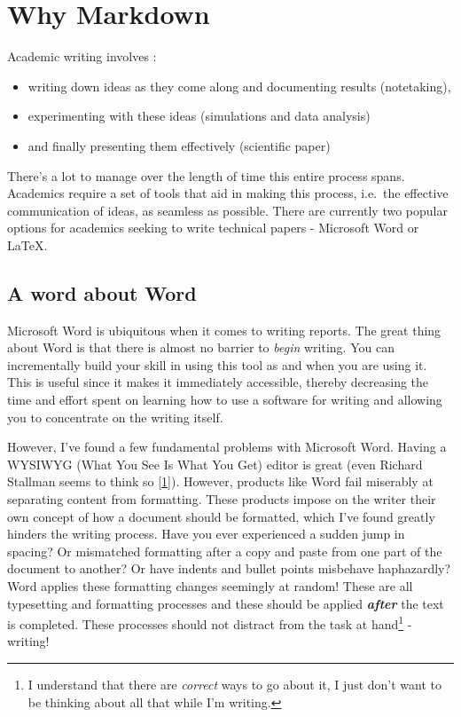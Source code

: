 \documentclass[journal,10pt,final]{IEEEtran}
\providecommand{\tightlist}{%
  \setlength{\itemsep}{0pt}\setlength{\parskip}{0pt}}
\begin{document}
\section{Why Markdown}\label{why-markdown}

Academic writing involves :

\begin{itemize}
\tightlist
\item
  writing down ideas as they come along and documenting results
  (notetaking),
\item
  experimenting with these ideas (simulations and data analysis)
\item
  and finally presenting them effectively (scientific paper)
\end{itemize}

There's a lot to manage over the length of time this entire process
spans. Academics require a set of tools that aid in making this process,
i.e.~the effective communication of ideas, as seamless as possible.
There are currently two popular options for academics seeking to write
technical papers - Microsoft Word or \LaTeX.

\subsection{A word about Word}\label{a-word-about-word}

Microsoft Word is ubiquitous when it comes to writing reports. The great
thing about Word is that there is almost no barrier to \emph{begin}
writing. You can incrementally build your skill in using this tool as
and when you are using it. This is useful since it makes it immediately
accessible, thereby decreasing the time and effort spent on learning how
to use a software for writing and allowing you to concentrate on the
writing itself.

However, I've found a few fundamental problems with Microsoft Word.
Having a WYSIWYG (What You See Is What You Get) editor is great (even
Richard Stallman seems to think so
{[}\protect\hyperlink{ref-stallmanux5femacs}{1}{]}). However, products
like Word fail miserably at separating content from formatting. These
products impose on the writer their own concept of how a document should
be formatted, which I've found greatly hinders the writing process. Have
you ever experienced a sudden jump in spacing? Or mismatched formatting
after a copy and paste from one part of the document to another? Or have
indents and bullet points misbehave haphazardly? Word applies these
formatting changes seemingly at random! These are all typesetting and
formatting processes and these should be applied \textbf{\emph{after}}
the text is completed. These processes should not distract from the task
at hand\footnote{I understand that there are \emph{correct} ways to go
  about it, I just don't want to be thinking about all that while I'm
  writing.} - writing!
\end{document}
